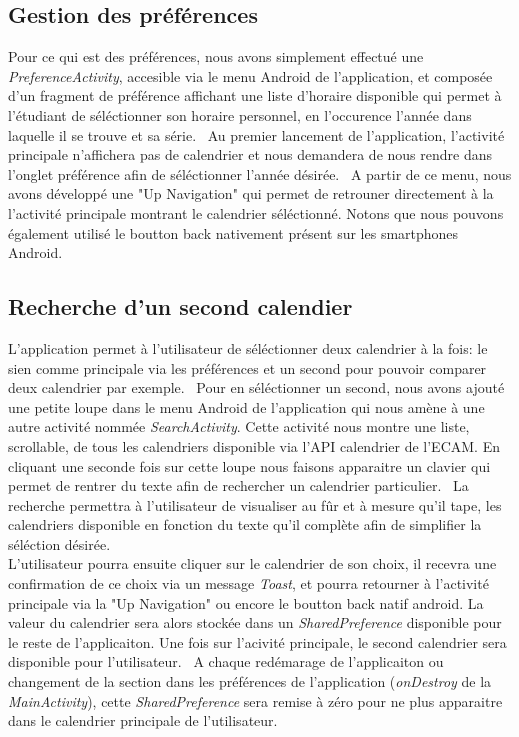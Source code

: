 \documentclass{article}
\begin{document}
	\subsection{Gestion des préférences}
    Pour ce qui est des préférences, nous avons simplement effectué une \textit{PreferenceActivity}, accesible via le menu Android de l'application,
		et composée d'un fragment de préférence affichant une liste d'horaire disponible
		qui permet à l'étudiant de séléctionner son horaire personnel, en l'occurence l'année dans laquelle il se trouve et sa série. \
		Au premier lancement de l'application, l'activité principale n'affichera pas de calendrier et nous demandera de nous rendre dans
		l'onglet préférence afin de séléctionner l'année désirée. \
		A partir de ce menu, nous avons développé une "Up Navigation" qui permet de retrouner directement à la l'activité principale montrant
		le calendrier séléctionné. Notons que nous pouvons également utilisé le boutton back
        nativement présent sur les smartphones Android.

	\subsection{Recherche d'un second calendier}
		L'application permet à l'utilisateur de séléctionner deux calendrier à la fois: le sien
        comme principale via les préférences et
		un second pour pouvoir comparer deux calendrier par exemple.  \
        Pour en séléctionner un second, nous avons ajouté une petite loupe dans le menu Android de l'application qui nous amène à une autre
        activité nommée \textit{SearchActivity}. Cette activité nous montre une liste, scrollable,
        de tous les calendriers disponible via l'API calendrier de l'ECAM.
		En cliquant une seconde fois sur cette loupe nous faisons apparaitre un clavier qui permet de rentrer du texte afin de rechercher
		un calendrier particulier. \
		La recherche permettra à l'utilisateur de visualiser au fûr et à mesure qu'il tape, les calendriers disponible en fonction du
		texte qu'il complète afin de simplifier la séléction désirée. \\
		L'utilisateur pourra ensuite cliquer  sur le calendrier de son choix, il recevra une
        confirmation de ce choix via un message \textit{Toast},
		et pourra retourner à l'activité principale via la "Up Navigation" ou encore le boutton back natif android. La valeur du calendrier
        sera alors stockée dans un \textit{SharedPreference} disponible pour le reste de l'applicaiton.
		Une fois sur l'acivité principale, le second calendrier sera disponible pour l'utilisateur. \
		A chaque redémarage de l'applicaiton ou changement de la section dans les préférences de
        l'application (\textit{onDestroy} de la \textit{MainActivity}),
        cette \textit{SharedPreference} sera remise à zéro pour ne plus apparaitre dans le calendrier principale de l'utilisateur.
\end{document}

